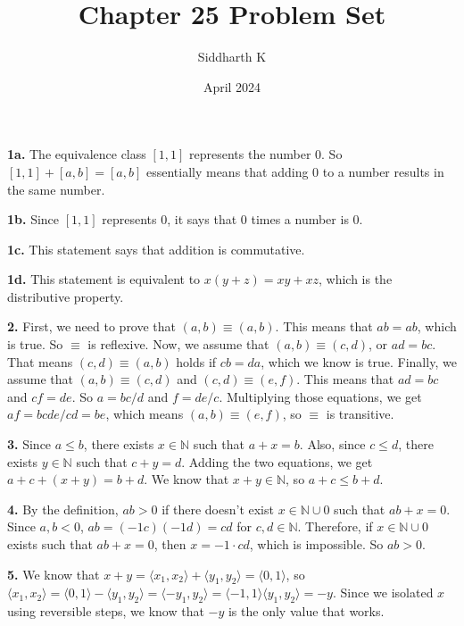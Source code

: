 \documentclass{article}
\title{Chapter 25 Problem Set}
\author{Siddharth K}
\date{April 2024}
\begin{document}
\maketitle

\textbf{1a.} The equivalence class $[1, 1]$ represents the number $0$. So $[1, 1] + [a, b] = [a, b]$ essentially means that adding $0$ to a number results in the same number.

\textbf{1b.} Since $[1, 1]$ represents $0$, it says that $0$ times a number is $0$.

\textbf{1c.} This statement says that addition is commutative.

\textbf{1d.} This statement is equivalent to $x(y + z) = xy + xz$, which is the distributive property.
\newline

\textbf{2.} First, we need to prove that $(a, b) \equiv (a, b)$. This means that $ab = ab$, which is true. So $\equiv$ is reflexive. Now, we assume that $(a, b) \equiv (c, d)$, or $ad = bc$. That means $(c, d) \equiv (a, b)$ holds if $cb = da$, which we know is true. Finally, we assume that $(a, b) \equiv (c, d)$ and $(c, d) \equiv (e, f)$. This means that $ad = bc$ and $cf = de$. So $a = bc/d$ and $f = de/c$. Multiplying those equations, we get $af = bcde/cd = be$, which means $(a, b) \equiv (e, f)$, so $\equiv$ is transitive.
\newline

\textbf{3.} Since $a \le b$, there exists $x \in \mathbb{N}$ such that $a + x = b$. Also, since $c \le d$, there exists $y \in \mathbb{N}$ such that $c + y = d$. Adding the two equations, we get $a + c + (x + y) = b + d$. We know that $x + y \in \mathbb{N}$, so $a + c \le b + d$.
\newline

\textbf{4.} By the definition, $ab > 0$ if there doesn't exist $x \in \mathbb{N} \cup {0}$ such that $ab + x = 0$. Since $a, b < 0$, $ab = (-1c)(-1d) = cd$ for $c, d \in \mathbb{N}$. Therefore, if $x \in \mathbb{N} \cup {0}$ exists such that $ab + x = 0$, then $x = -1\cdot cd$, which is impossible. So $ab > 0$.
\newline

\textbf{5.} We know that $x + y = \langle x_1, x_2 \rangle + \langle y_1, y_2 \rangle = \langle 0, 1 \rangle$, so $\langle x_1, x_2 \rangle = \langle 0, 1 \rangle - \langle y_1, y_2 \rangle = \langle -y_1, y_2 \rangle = \langle -1, 1 \rangle \langle y_1, y_2 \rangle = -y$. Since we isolated $x$ using reversible steps, we know that $-y$ is the only value that works.
\newline
\end{document}

